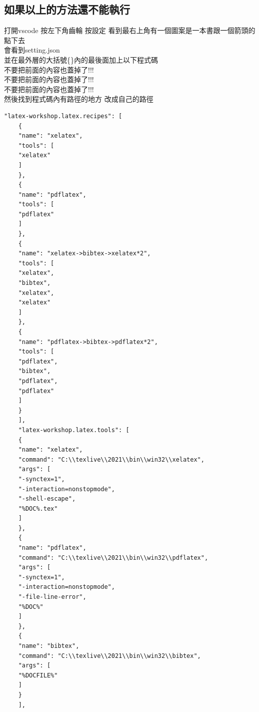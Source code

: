 \documentclass[12pt]{article}
\begin{document}
\begin{CJK*}{UTF8}{bsmi}
    \subsection{如果以上的方法還不能執行}
    打開vscode 按左下角齒輪 按設定 看到最右上角有一個圖案是一本書跟一個箭頭的點下去\\
    會看到setting.json\\
    並在最外層的大括號\{\}內的最後面加上以下程式碼\\
    不要把前面的內容也蓋掉了!!!\\
    不要把前面的內容也蓋掉了!!!\\
    不要把前面的內容也蓋掉了!!!\\
    然後找到程式碼內有路徑的地方 改成自己的路徑\\

    \begin{lstlisting}[frame=single]
    "latex-workshop.latex.recipes": [
    {
    "name": "xelatex",
    "tools": [
    "xelatex"
    ]
    },
    {
    "name": "pdflatex",
    "tools": [
    "pdflatex"
    ]
    },
    {
    "name": "xelatex->bibtex->xelatex*2",
    "tools": [
    "xelatex",
    "bibtex",
    "xelatex",
    "xelatex"
    ]
    },
    {
    "name": "pdflatex->bibtex->pdflatex*2",
    "tools": [
    "pdflatex",
    "bibtex",
    "pdflatex",
    "pdflatex"
    ]
    }
    ],
    "latex-workshop.latex.tools": [
    {
    "name": "xelatex",
    "command": "C:\\texlive\\2021\\bin\\win32\\xelatex",
    "args": [
    "-synctex=1",
    "-interaction=nonstopmode",
    "-shell-escape",
    "%DOC%.tex"
    ]
    },
    {
    "name": "pdflatex",
    "command": "C:\\texlive\\2021\\bin\\win32\\pdflatex",
    "args": [
    "-synctex=1",
    "-interaction=nonstopmode",
    "-file-line-error",
    "%DOC%"
    ]
    },
    {
    "name": "bibtex",
    "command": "C:\\texlive\\2021\\bin\\win32\\bibtex",
    "args": [
    "%DOCFILE%"
    ]
    }
    ],
    \end{lstlisting}


\end{CJK*}
\end{document}

